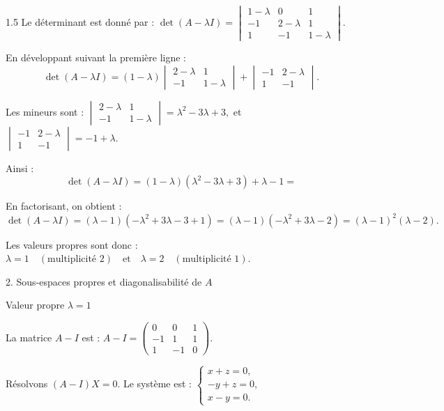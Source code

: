 \documentclass[12pt]{article}
\begin{document}
\begin{spacing}{1.5}
Le déterminant est donné par :
$
\det(A - \lambda I) = \begin{vmatrix}
1-\lambda & 0 & 1 \\ 
-1 & 2-\lambda & 1 \\ 
1 & -1 & 1-\lambda
\end{vmatrix}.
$

En développant suivant la première ligne :
\[
\det(A - \lambda I) = (1-\lambda) \begin{vmatrix}
2-\lambda & 1 \\ 
-1 & 1-\lambda
\end{vmatrix} 
+ \begin{vmatrix}
-1 & 2-\lambda \\ 
1 & -1
\end{vmatrix}.
\]

Les mineurs sont :
$
\begin{vmatrix}
2-\lambda & 1 \\ 
-1 & 1-\lambda
\end{vmatrix} = \lambda^2 - 3\lambda + 3,$ et 
$
\begin{vmatrix}
-1 & 2-\lambda \\ 
1 & -1
\end{vmatrix} = -1+\lambda.
$

Ainsi :
\[
\det(A - \lambda I) = (1-\lambda)(\lambda^2 - 3\lambda + 3) +\lambda -1=
\]

En factorisant, on obtient :
\[
\det(A - \lambda I) =(\lambda-1)(-\lambda^2 + 3\lambda - 3+1)=(\lambda-1)(-\lambda^2 + 3\lambda -2)= (\lambda - 1)^2 (\lambda - 2).
\]

Les valeurs propres sont donc :
$
\lambda = 1 \quad (\text{multiplicité 2}) \quad \text{et} \quad \lambda = 2 \quad (\text{multiplicité 1}).
$

2. Sous-espaces propres et diagonalisabilité de $A$

Valeur propre $\lambda = 1$

La matrice $A - I$ est :
$
A - I = 
\begin{pmatrix}
0 & 0 & 1 \\ 
-1 & 1 & 1 \\ 
1 & -1 & 0
\end{pmatrix}.
$

Résolvons $(A - I)X = 0$. Le système est :
$
\begin{cases}
x + z = 0, \\
-y + z = 0, \\
x - y = 0.
\end{cases}
$


\end{spacing}
\end{document}
